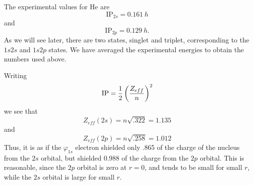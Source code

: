 {The experimental values for He are
\begin{equation}
\mathrm{IP}_{2s} = 0.161\ h
\end{equation}
and
\begin{equation}
\mathrm{IP}_{2p} = 0.129\ h .
\end{equation}
As we will see later, there are two states, singlet and triplet, 
corresponding to the $1s2s$ and $1s2p$ states. We have averaged the 
experimental energies to obtain the numbers used above.

Writing
\begin{equation}
\mathrm{IP} = {1 \over 2} \left( {Z_{eff} \over n} \right)^2
\end{equation}
we see that
\begin{equation}
Z_{eff}(2s) = n \sqrt{.322} = 1.135
\end{equation}
and
\begin{equation}
Z_{eff}(2p) = n \sqrt{.258} = 1.012
\end{equation}
Thus, it is as if the $\varphi_{1s}$ electron shielded only .865 of the 
charge of the nucleus from the $2s$ orbital, but shielded 0.988 of the 
charge from the $2p$ orbital.  This is reasonable, since the
$2p$ orbital is zero at $r = 0$, and tends to be small for small $r$, 
while the $2s$ orbital is large for small $r$.

}
